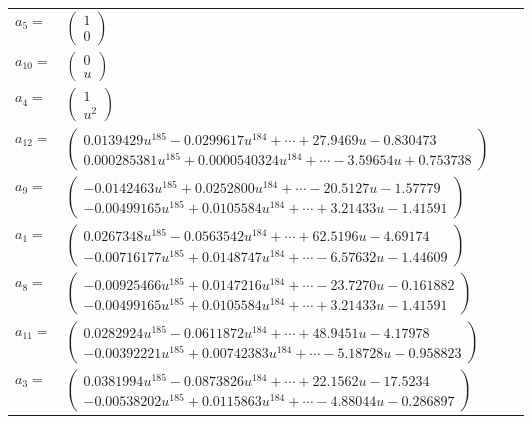 \documentclass[1p]{elsarticle_modified}
\theoremstyle{definition}
\begin{document}
\begin{tabular}{m{7pt} m{180pt} m{7pt} m{180pt} }
\flushright $a_{5}=$&$\begin{pmatrix}1\\0\end{pmatrix}$ \\
\flushright $a_{10}=$&$\begin{pmatrix}0\\u\end{pmatrix}$ \\
\flushright $a_{4}=$&$\begin{pmatrix}1\\u^2\end{pmatrix}$ \\
\flushright $a_{12}=$&$\begin{pmatrix}0.0139429 u^{185}-0.0299617 u^{184}+\cdots+27.9469 u-0.830473\\0.000285381 u^{185}+0.0000540324 u^{184}+\cdots-3.59654 u+0.753738\end{pmatrix}$ \\
\flushright $a_{9}=$&$\begin{pmatrix}-0.0142463 u^{185}+0.0252800 u^{184}+\cdots-20.5127 u-1.57779\\-0.00499165 u^{185}+0.0105584 u^{184}+\cdots+3.21433 u-1.41591\end{pmatrix}$ \\
\flushright $a_{1}=$&$\begin{pmatrix}0.0267348 u^{185}-0.0563542 u^{184}+\cdots+62.5196 u-4.69174\\-0.00716177 u^{185}+0.0148747 u^{184}+\cdots-6.57632 u-1.44609\end{pmatrix}$ \\
\flushright $a_{8}=$&$\begin{pmatrix}-0.00925466 u^{185}+0.0147216 u^{184}+\cdots-23.7270 u-0.161882\\-0.00499165 u^{185}+0.0105584 u^{184}+\cdots+3.21433 u-1.41591\end{pmatrix}$ \\
\flushright $a_{11}=$&$\begin{pmatrix}0.0282924 u^{185}-0.0611872 u^{184}+\cdots+48.9451 u-4.17978\\-0.00392221 u^{185}+0.00742383 u^{184}+\cdots-5.18728 u-0.958823\end{pmatrix}$ \\
\flushright $a_{3}=$&$\begin{pmatrix}0.0381994 u^{185}-0.0873826 u^{184}+\cdots+22.1562 u-17.5234\\-0.00538202 u^{185}+0.0115863 u^{184}+\cdots-4.88044 u-0.286897\end{pmatrix}$ \\

\end{tabular}
\end{document}

